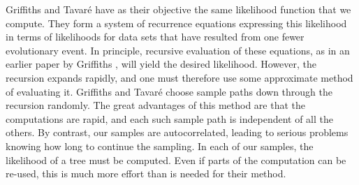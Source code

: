 Griffiths and Tavar\'e have as their objective the same likelihood function
that we compute.  They form a system of recurrence equations expressing this
likelihood in terms of likelihoods for data sets that have resulted from
one fewer evolutionary event.  In principle, recursive evaluation of these
equations, as in an earlier paper by Griffiths \cite{Griffiths89}, will yield the desired
likelihood.  However, the recursion expands rapidly, and one must therefore
use some approximate method of evaluating it.  Griffiths and Tavar\'e 
\cite{GT94a, GT94b, GT94c} choose
sample paths down through the recursion randomly.  The great advantages of
this method are that the computations are rapid, and each such sample
path is independent of all the others.  By contrast, our samples are
autocorrelated, leading to serious problems knowing how long to continue
the sampling.  In each of our samples, the likelihood of a tree must be
computed.  Even if parts of the computation can be re-used, this is much
more effort than is needed for their method.

